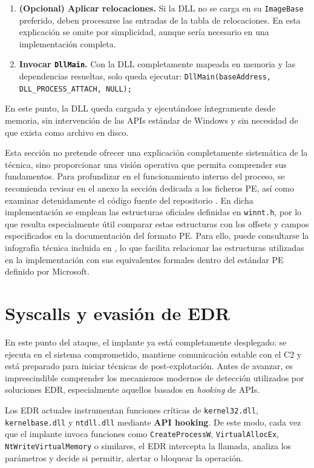 \begin{enumerate}
    \item \textbf{(Opcional) Aplicar relocaciones.}  
    Si la DLL no se carga en su \texttt{ImageBase} preferido, deben procesarse las entradas de la tabla de relocaciones.  
    En esta explicación se omite por simplicidad, aunque sería necesario en una implementación completa.

    \item \textbf{Invocar \texttt{DllMain}.}  
    Con la DLL completamente mapeada en memoria y las dependencias resueltas, solo queda ejecutar:  
    \texttt{DllMain(baseAddress, DLL\_PROCESS\_ATTACH, NULL);}  
\end{enumerate}

En este punto, la DLL queda cargada y ejecutándose íntegramente desde memoria, sin intervención de las APIs estándar de Windows y sin necesidad de que exista como archivo en disco.

Esta sección no pretende ofrecer una explicación completamente sistemática de la técnica, sino proporcionar una visión operativa que permita comprender sus fundamentos. Para profundizar en el funcionamiento interno del proceso, se recomienda revisar en el anexo la sección dedicada a los ficheros PE, así como examinar detenidamente el código fuente del repositorio \cite{walkingloader}. En dicha implementación se emplean las estructuras oficiales definidas en \texttt{winnt.h}, por lo que resulta especialmente útil comparar estas estructuras con los offsets y campos especificados en la documentación del formato PE. Para ello, puede consultarse la infografía técnica incluida en \cite{peinfografia}, lo que facilita relacionar las estructuras utilizadas en la implementación con sus equivalentes formales dentro del estándar PE definido por Microsoft.

\section{Syscalls y evasión de EDR}

En este punto del ataque, el implante ya está completamente desplegado: se ejecuta en el sistema comprometido, mantiene comunicación estable con el C2 y está preparado para iniciar técnicas de post-explotación. Antes de avanzar, es imprescindible comprender los mecanismos modernos de detección utilizados por soluciones EDR, especialmente aquellos basados en \textit{hooking} de APIs.

Los EDR actuales instrumentan funciones críticas de \texttt{kernel32.dll}, \texttt{kernelbase.dll} y \texttt{ntdll.dll} mediante \textbf{API hooking}. De este modo, cada vez que el implante invoca funciones como \texttt{CreateProcessW}, \texttt{VirtualAllocEx}, \texttt{NtWriteVirtualMemory} o similares, el EDR intercepta la llamada, analiza los parámetros y decide si permitir, alertar o bloquear la operación.

